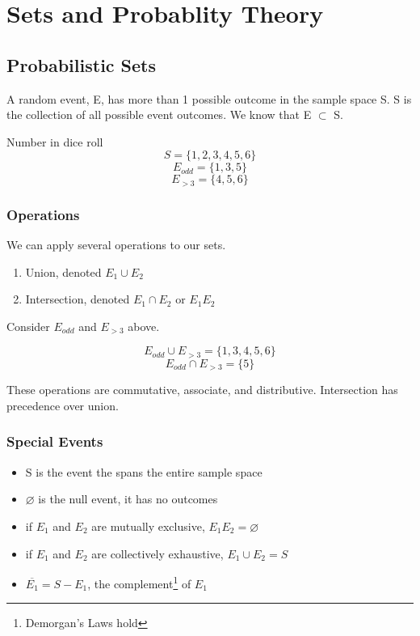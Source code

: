 \chapter{Sets and Probablity Theory}

\section{Probabilistic Sets}
A random event, E, has more than 1 possible outcome in the sample space S. S is the collection of all possible event outcomes. We know that E $\subset$ S.

\begin{example}
    Number in dice roll
    \[S = \{1, 2, 3, 4, 5, 6\}\]
    \[E_{odd} = \{1, 3, 5\}\]
    \[E_{>3} = \{4, 5, 6\}\]
\end{example}

\subsection*{Operations}
We can apply several operations to our sets.

\begin{enumerate}
    \item Union, denoted $E_1 \cup E_2$
    \item Intersection, denoted $E_1 \cap E_2$ or $E_1E_2$
\end{enumerate}

\vspace{.5cm}

Consider $E_{odd}$ and $E_{>3}$ above.

\[E_{odd} \cup E_{>3} = \{1, 3, 4, 5, 6\}\]
\[E_{odd} \cap E_{>3} = \{5\}\]

These operations are commutative, associate, and distributive. Intersection has precedence over union. 

\vspace{.5cm}

\subsection*{Special Events}
\begin{itemize}
    \item S is the event the spans the entire sample space
    \item $\varnothing$ is the null event, it has no outcomes
    \item if $E_1$ and $E_2$ are mutually exclusive, $E_1E_2 = \varnothing$
    \item if $E_1$ and $E_2$ are collectively exhaustive, $E_1 \cup E_2 = S$
    \item  $\overline{E_1} = S - E_1$, the complement\footnote[1]{Demorgan's Laws hold} of $E_1$  
\end{itemize}

